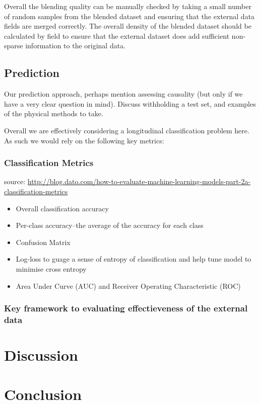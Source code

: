 \documentclass{article}
\begin{document}
\noindent Overall the blending quality can be manually checked by taking 
a small number of random samples from the blended dataset and ensuring that the 
external data fields are merged correctly. The overall density of the blended 
dataset should be calculated by field to ensure that the external dataset does 
add sufficient non-sparse information to the original data.

\subsection{Prediction}

Our prediction approach, perhaps mention assessing causality (but only if we 
have a very clear question in mind). Discuss withholding a test set, and 
examples of the physical methods to take.

\noindent Overall we are effectively considering a longitudinal classification
problem here. As such we would rely on the following key metrics:

\subsubsection{Classification Metrics}
source: \url{http://blog.dato.com/how-to-evaluate-machine-learning-models-part-2a-classification-metrics}
\begin{itemize}
  \item  Overall classification accuracy
  \item  Per-class accuracy--the average of the accuracy for each class
  \item  Confusion Matrix
  \item  Log-loss to guage a sense of entropy of classification and help tune 
         model to minimise cross entropy
  \item  Area Under Curve (AUC) and Receiver Operating Characteristic (ROC)
\end{itemize}

\subsubsection{Key framework to evaluating effectieveness of the external data}

\noindent 


\section{Discussion}

\section{Conclusion}
\end{document}
